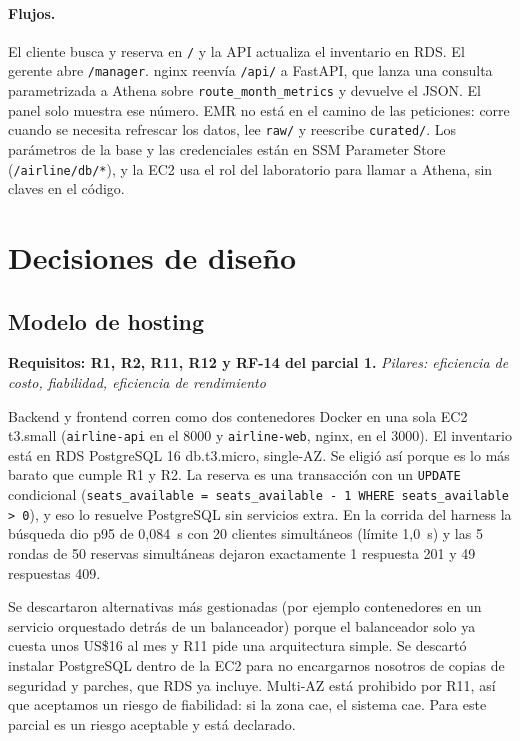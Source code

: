 \documentclass[11pt,letterpaper]{article}
\newcommand{\trazo}[2]{\par\smallskip\noindent\textbf{#1.} \textit{#2}\par\smallskip}
\begin{document}
\paragraph{Flujos.}
El cliente busca y reserva en \texttt{/} y la API actualiza el inventario en RDS. El gerente abre \texttt{/manager}. nginx reenvía \texttt{/api/} a FastAPI, que lanza una consulta parametrizada a Athena sobre \texttt{route\_month\_metrics} y devuelve el JSON. El panel solo muestra ese número. EMR no está en el camino de las peticiones: corre cuando se necesita refrescar los datos, lee \texttt{raw/} y reescribe \texttt{curated/}. Los parámetros de la base y las credenciales están en SSM Parameter Store (\texttt{/airline/db/*}), y la EC2 usa el rol del laboratorio para llamar a Athena, sin claves en el código.

\section{Decisiones de diseño}

\subsection{Modelo de hosting}
\trazo{Requisitos: R1, R2, R11, R12 y RF-14 del parcial 1}{Pilares: eficiencia de costo, fiabilidad, eficiencia de rendimiento}
Backend y frontend corren como dos contenedores Docker en una sola EC2 t3.small (\texttt{airline-api} en el 8000 y \texttt{airline-web}, nginx, en el 3000). El inventario está en RDS PostgreSQL 16 db.t3.micro, single-AZ. Se eligió así porque es lo más barato que cumple R1 y R2. La reserva es una transacción con un \texttt{UPDATE} condicional (\texttt{seats\_available = seats\_available - 1 WHERE seats\_available > 0}), y eso lo resuelve PostgreSQL sin servicios extra. En la corrida del harness la búsqueda dio p95 de 0,084~s con 20 clientes simultáneos (límite 1,0~s) y las 5 rondas de 50 reservas simultáneas dejaron exactamente 1 respuesta 201 y 49 respuestas 409.

Se descartaron alternativas más gestionadas (por ejemplo contenedores en un servicio orquestado detrás de un balanceador) porque el balanceador solo ya cuesta unos US\$16 al mes y R11 pide una arquitectura simple. Se descartó instalar PostgreSQL dentro de la EC2 para no encargarnos nosotros de copias de seguridad y parches, que RDS ya incluye. Multi-AZ está prohibido por R11, así que aceptamos un riesgo de fiabilidad: si la zona cae, el sistema cae. Para este parcial es un riesgo aceptable y está declarado.
\end{document}
